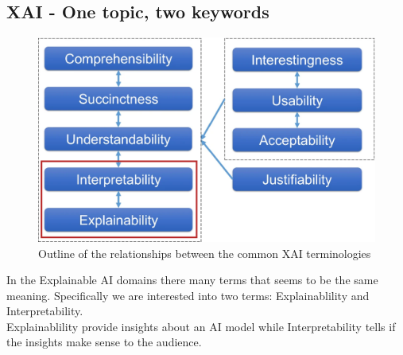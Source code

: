 \subsection{XAI - One topic, two keywords}
\begin{minipage}[c]{0.3\textwidth}
    \begin{figure}[H]
        \includegraphics[width=\textwidth]{img/many_words.png}
        \centering
        \caption{Outline of the relationships between the common XAI terminologies}
    \end{figure}    
\end{minipage}
\hfill%
\begin{minipage}[c]{0.65\textwidth}
    In the Explainable AI domains there many terms that seems to be the same meaning.
    Specifically we are interested into two terms: Explainablility and Interpretability.\\
    
    Explainablility provide insights about an AI model while Interpretability tells if the insights make sense to the audience.
\end{minipage}


